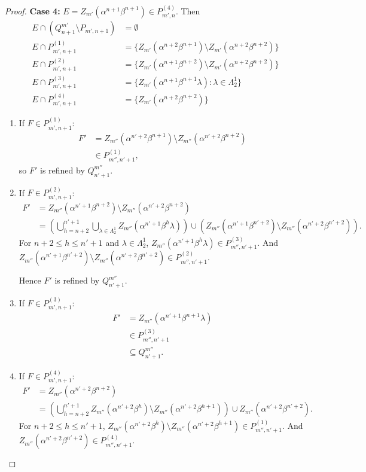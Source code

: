 \documentclass[10pt,a4paper]{amsart}
\newcommand{\La}{\Lambda}
\newcommand{\al}{\alpha}
\newcommand{\be}{\beta}
\newcommand{\emp}{\emptyset}
\newcommand{\la}{\lambda}
\newcommand{\sm}{\setminus}
\newcommand{\sse}{\subseteq}
\begin{document}
\begin{proof}
    \textbf{Case 4:} $E = Z_{m'}(\al^{n+1}\be^{n+1}) \in P_{m',n}^{(4)}$. Then
    \begin{align*}
        E \cap (Q^{m'}_{n+1} \sm P_{m', n+1}) &= \emp\\
        E \cap P^{(1)}_{m',n+1} &= \{Z_{m'}(\al^{n+2}\be^{n+1}) \sm Z_{m'}(\al^{n+2}\be^{n+2})\} \\
        E \cap P^{(2)}_{m',n+1} &= \{ Z_{m'}(\al^{n+1}\be^{n+2}) \sm Z_{m'}(\al^{n+2} \be^{n+2}) \}\\
        E \cap P^{(3)}_{m',n+1} &= \{ Z_{m'}(\al^{n+1}\be^{n+1} \la) : \la \in \La_2^1\} \\
        E \cap P^{(4)}_{m',n+1} &= \{Z_{m'}(\al^{n+2}\be^{n+2})\}
    \end{align*}
    \begin{enumerate}
        \item If $F \in P^{(1)}_{m',n+1}$: \begin{align*}
            F' &= Z_{m''}(\al^{n'+2} \be^{n+1})\sm Z_{m''}(\al^{n'+2} \be^{n+2})\\
            &\in P^{(1)}_{m'', n'+1},
        \end{align*}
        so $F'$ is refined by $Q_{n'+1}^{m''}$.

        \item If $F \in P^{(2)}_{m',n+1}$:
        \begin{align*}
            F' &= Z_{m''}(\al^{n'+1}\be^{n+2}) \sm Z_{m''}(\al^{n'+2} \be^{n+2})\\
            &= \left(\bigcup_{h=n+2}^{n'+1} \bigcup_{\la \in \La_2^1} Z_{m''}(\al^{n'+1} \be^h \la) \right) \cup \left( Z_{m''}(\al^{n'+1} \be^{n'+2}) \sm Z_{m''}(\al^{n'+2} \be^{n'+2})\right).
        \end{align*}
        For $n+2 \le h \le n'+1$ and $\la \in \La_2^1$, $Z_{m''}(\al^{n'+1} \be^h \la) \in P^{(3)}_{m'', n'+1}$. And $Z_{m''}(\al^{n'+1} \be^{n'+2}) \sm Z_{m''}(\al^{n'+2} \be^{n'+2}) \in P^{(2)}_{m'', n'+1}$.

        Hence $F'$ is refined by $Q^{m''}_{n'+1}$.

        \item If $F \in P^{(3)}_{m',n+1}$: \begin{align*}
            F' &= Z_{m''}(\al^{n'+1}\be^{n+1}\la)\\
            &\in P^{(3)}_{m'', n'+1}\\
            &\sse Q_{n'+1}^{m''}.
        \end{align*}

        \item If $F \in P^{(4)}_{m',n+1}$: 
        \begin{align*}
            F' &= Z_{m''}(\al^{n'+2} \be^{n+2} ) \\
            &= \left( \bigcup_{h=n+2}^{n'+1} Z_{m''}(\al^{n'+2} \be^h) \sm Z_{m''}(\al^{n'+2}\be^{h+1}) \right) \cup Z_{m''}(\al^{n'+2} \be^{n'+2}).
        \end{align*}
        For $n+2 \le h \le n'+1$, $Z_{m''}(\al^{n'+2} \be^h) \sm Z_{m''}(\al^{n'+2}\be^{h+1}) \in P^{(1)}_{m'', n'+1}$. And $Z_{m''}(\al^{n'+2} \be^{n'+2}) \in P^{(4)}_{m'', n'+1}$.
        

\end{enumerate}
\end{proof}
\end{document}
